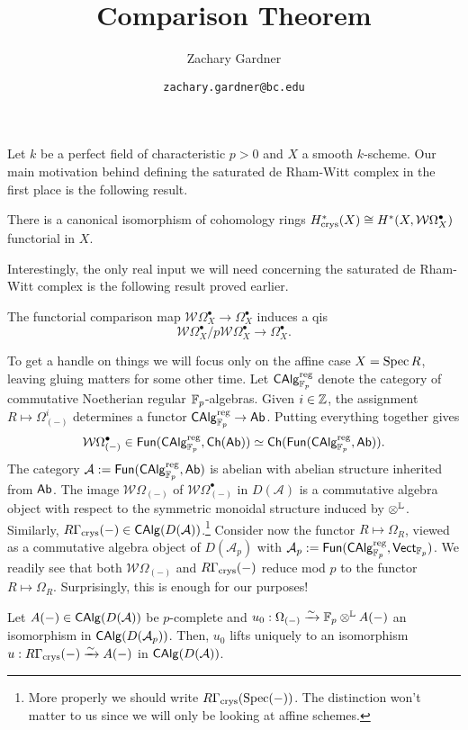 \documentclass[11pt]{article}
\renewcommand{\A}{\mathcal{A}}
\newcommand{\W}{\mathcal{W}} %
\begin{document}
\title{Comparison Theorem}
\author{Zachary Gardner}
\date{\texttt{zachary.gardner@bc.edu}}
\maketitle

Let $k$ be a perfect field of characteristic $p>0$ and $X$ a smooth $k$-scheme. Our main motivation behind defining the saturated de Rham-Witt complex in the first place is the following result.

\begin{theorem}
There is a canonical isomorphism of cohomology rings $H_{\crys}^*(X)\iso H^*(X,\W\Omega_X^{\bullet})$ functorial in $X$.
\end{theorem}

Interestingly, the only real input we will need concerning the saturated de Rham-Witt complex is the following result proved earlier.

\begin{theorem}
The functorial comparison map $\W\Omega_X^{\bullet}\to\Omega_X^{\bullet}$ induces a qis 
$$\W\Omega_X^{\bullet}/p\W\Omega_X^{\bullet}\to\Omega_X^{\bullet}.$$
\end{theorem}

To get a handle on things we will focus only on the affine case $X=\operatorname{Spec} R$, leaving gluing matters for some other time. Let $\operatorname{\mathsf{CAlg}}_{\mathbb{F}_p}^{\operatorname{reg}}$ denote the category of commutative Noetherian regular $\mathbb{F}_p$-algebras. Given $i\in\mathbb{Z}$, the assignment $R\mapsto\Omega_{(-)}^i$ determines a functor $\operatorname{\mathsf{CAlg}}_{\mathbb{F}_p}^{\operatorname{reg}}\to\operatorname{\mathsf{Ab}}$. Putting everything together gives 
$$\W\Omega_{(-)}^{\bullet}\in\Fun(\CAlg_{\F_p}^{\reg},\Ch(\Ab))\simeq\Ch(\Fun(\CAlg_{\F_p}^{\reg},\Ab)).$$
The category $\A:=\Fun(\CAlg_{\F_p}^{\reg},\Ab)$ is abelian with abelian structure inherited from $\operatorname{\mathsf{Ab}}$. The image $\W\Omega_{(-)}$ of $\W\Omega_{(-)}^{\bullet}$ in $D(\A)$ is a commutative algebra object with respect to the symmetric monoidal structure induced by $\otimes^{\mathbb{L}}$. Similarly, $R\Gamma_{\crys}(-)\in\CAlg(D(\A))$.\footnote{More properly we should write $R\Gamma_{\operatorname{crys}}(\operatorname{Spec}(-))$. The distinction won't matter to us since we will only be looking at affine schemes.} Consider now the functor $R\mapsto\Omega_R$, viewed as a commutative algebra object of $D(\A_p)$ with $\A_p:=\Fun(\CAlg_{\F_p}^{\reg},\Vect_{\F_p})$. We readily see that both $\W\Omega_{(-)}$ and $R\Gamma_{\operatorname{crys}}(-)$ reduce mod $p$ to the functor $R\mapsto\Omega_R$. Surprisingly, this is enough for our purposes!

\begin{theorem}
Let $A(-)\in\CAlg(D(\A))$ be $p$-complete and $u_0: \Omega_{(-)}\xrightarrow{\sim}\mathbb{F}_p\otimes^{\mathbb{L}} A(-)$ an isomorphism in $\CAlg(D(\A_p))$. Then, $u_0$ lifts uniquely to an isomorphism $u: R\Gamma_{\operatorname{crys}}(-)\xrightarrow{\sim}A(-)$ in $\CAlg(D(\A))$.
\end{theorem}
\end{document}
